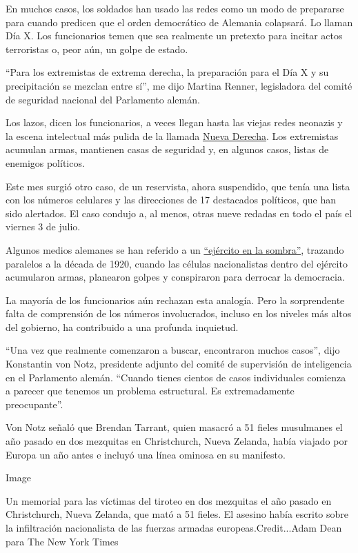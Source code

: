 En muchos casos, los soldados han usado las redes como un modo de
prepararse para cuando predicen que el orden democrático de Alemania
colapsará. Lo llaman Día X. Los funcionarios temen que sea realmente un
pretexto para incitar actos terroristas o, peor aún, un golpe de estado.

``Para los extremistas de extrema derecha, la preparación para el Día X
y su precipitación se mezclan entre sí'', me dijo Martina Renner,
legisladora del comité de seguridad nacional del Parlamento alemán.

Los lazos, dicen los funcionarios, a veces llegan hasta las viejas redes
neonazis y la escena intelectual más pulida de la llamada
\href{https://www.nytimes.com/2018/12/27/world/europe/germany-far-right-generation-identity.html}{Nueva
Derecha}. Los extremistas acumulan armas, mantienen casas de seguridad
y, en algunos casos, listas de enemigos políticos.

Este mes surgió otro caso, de un reservista, ahora suspendido, que tenía
una lista con los números celulares y las direcciones de 17 destacados
políticos, que han sido alertados. El caso condujo a, al menos, otras
nueve redadas en todo el país el viernes 3 de julio.

Algunos medios alemanes se han referido a un
\href{https://taz.de/Rechtes-Netzwerk-in-der-Bundeswehr/!5548926/}{``ejército
en la sombra''}, trazando paralelos a la década de 1920, cuando las
células nacionalistas dentro del ejército acumularon armas, planearon
golpes y conspiraron para derrocar la democracia.

La mayoría de los funcionarios aún rechazan esta analogía. Pero la
sorprendente falta de comprensión de los números involucrados, incluso
en los niveles más altos del gobierno, ha contribuido a una profunda
inquietud.

``Una vez que realmente comenzaron a buscar, encontraron muchos casos'',
dijo Konstantin von Notz, presidente adjunto del comité de supervisión
de inteligencia en el Parlamento alemán. ``Cuando tienes cientos de
casos individuales comienza a parecer que tenemos un problema
estructural. Es extremadamente preocupante''.

Von Notz señaló que Brendan Tarrant, quien masacró a 51 fieles
musulmanes el año pasado en dos mezquitas en Christchurch, Nueva
Zelanda, había viajado por Europa un año antes e incluyó una línea
ominosa en su manifesto.

Image

Un memorial para las víctimas del tiroteo en dos mezquitas el año pasado
en Christchurch, Nueva Zelanda, que mató a 51 fieles. El asesino había
escrito sobre la infiltración nacionalista de las fuerzas armadas
europeas.Credit...Adam Dean para The New York Times

